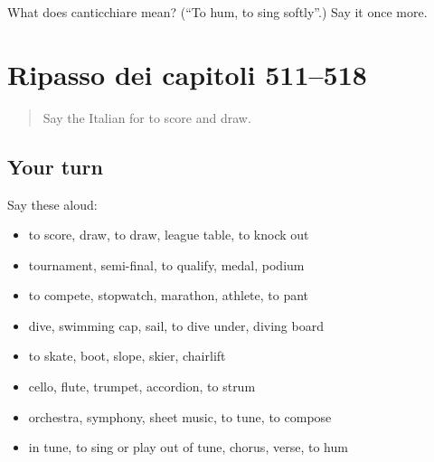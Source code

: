 \begin{tcolorbox}[breakable,colback=teal!4,colframe=teal!35!black,title={Before you move on}]
What does canticchiare mean? (\textquotedblleft{}To hum, to sing softly\textquotedblright{}.) Say it once more.
\end{tcolorbox}
\section[(dialogue)]{Ripasso dei capitoli 511–518}

\label{lesson:IT-R518-ripasso-511-518}



\begin{quote}
Say the Italian for to score and draw.
\end{quote}

\subsection*{Your turn}
Say these aloud:

\begin{itemize}
\raggedright
  \item to score, draw, to draw, league table, to knock out
  \item tournament, semi-final, to qualify, medal, podium
  \item to compete, stopwatch, marathon, athlete, to pant
  \item dive, swimming cap, sail, to dive under, diving board
  \item to skate, boot, slope, skier, chairlift
  \item cello, flute, trumpet, accordion, to strum
  \item orchestra, symphony, sheet music, to tune, to compose
  \item in tune, to sing or play out of tune, chorus, verse, to hum
\end{itemize}

